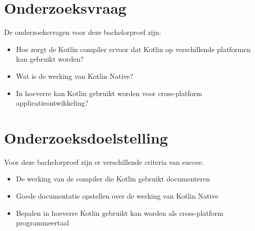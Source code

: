 
\section{Onderzoeksvraag}
\label{sec:onderzoeksvraag}
De onderzoeksvragen voor deze bachelorproef zijn: 
\begin{itemize}
	\item Hoe zorgt de Kotlin compiler ervoor dat Kotlin op verschillende platformen kan gebruikt worden?
	\item Wat is de werking van Kotlin Native?
	\item In hoeverre kan Kotlin gebruikt worden voor cross-platform applicatieontwikkeling?
\end{itemize}

\section{Onderzoeksdoelstelling}
\label{sec:onderzoeksdoelstelling}
Voor deze bachelorproef zijn er verschillende criteria van succes:
\begin{itemize}
	\item De werking van de compiler die Kotlin gebruikt documenteren
	\item Goede documentatie opstellen over de werking van Kotlin Native
	\item Bepalen in hoeverre Kotlin gebruikt kan worden als cross-platform programmeertaal
\end{itemize}

